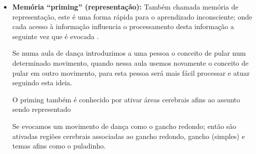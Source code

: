 \begin{itemize}
As repetições das ações levam ao fortalecimento da memória procedural
\cite[pp. 36]{de2000comprension};
quando as pessoas iniciam a aprender uma nova tarefa, 
estas dependem geralmente da sua 
\hyperref[posref:memoriaepisodica]{\textbf{memoria episódica}} e 
\hyperref[posref:memoriasemantica]{\textbf{semântica}},
ou seja a memória \hyperref[subsubsec:explicita]{\textbf{declarativa}}; 
porém com o tempo todas essas tarefas são sintetizadas numa única tarefa procedural,
virando natural em nós e provavelmente difícil de verbalizar (não declarativa) e expor como fazemos ela
 \cite[pp. 141]{pake2019psicologia}.
\begin{example}
Quando foi nos ensinado o movimento da trança, 
nós decoramos os movimentos e a ordem deles;
esta informação foi armazenada provavelmente em algum lugar da  
\hyperref[subsubsec:explicita]{\textbf{memória declarativa}},
já seja na memória episódica (se o professor criou um ambiente marcante emocionalmente)
ou na memória semântica (se o professor teve a habilidade pedagógica de fixar na memória cada parte do movimento);
porém com muito tempo de treino que envolve varias repetições,
esta informação foi conformando-se numa única tarefa procedural (memoria procedural), a "trança",
 que não precisava de muita de nossa atenção\footnote{Devemos ter cuidado que neste processo,
a informação na memoria declarativa tende a perde-se por falta de uso, 
isto poderia ser pouco importante sim só queremos dançar, 
porém é um problema sim queremos ou devemos ensinar este movimento aos demais.}.
\end{example}

\item \textbf{Memória ``priming'' (representação):}
Também chamada memória de representação, 
este é uma forma rápida para o aprendizado inconsciente;
onde cada acesso à informação influencia o processamento desta informação a seguinte vez que é evocada
\cite[pp. 141]{pake2019psicologia}.
\begin{example}[Pular:]
Se numa aula de dança introduzimos a uma pessoa o conceito de pular num determinado movimento, 
quando nessa aula usemos novamente o conceito de pular em outro movimento, 
para esta pessoa será mais fácil processar e atuar seguindo esta ideia.
\end{example}

O priming também é conhecido por ativar áreas cerebrais afins ao assunto sendo representado
\cite[pp. 142]{pake2019psicologia}
\begin{example}
Se evocamos um movimento de dança como o gancho redondo;
então são ativadas regiões cerebrais associadas ao gancho redondo, 
gancho (simples) e temas afins como o puladinho.
\end{example}

\end{itemize}

